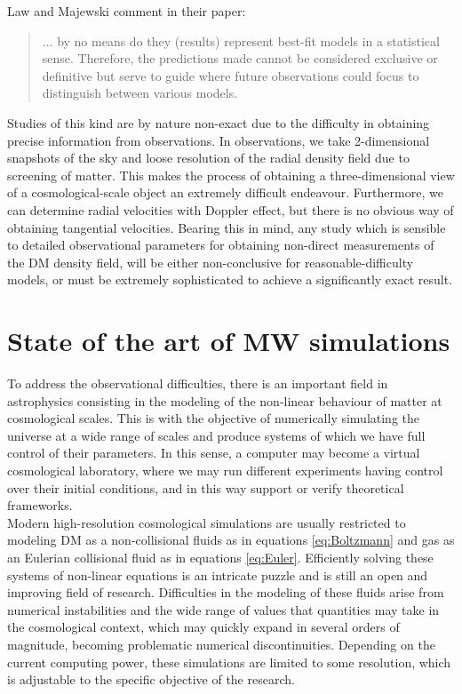 Law and Majewski comment in their paper: 

\blockquote{... by no means do they (results) represent best-fit models in a statistical sense. Therefore, the predictions made cannot be considered exclusive or definitive but serve to guide where future observations could focus to distinguish between various models.}

Studies of this kind are by nature non-exact due to the difficulty in obtaining precise information from observations.
In observations, we take 2-dimensional snapshots of the sky and loose resolution of the radial density field due to screening of matter. 
This makes the process of obtaining  a three-dimensional view of a cosmological-scale object an extremely difficult endeavour. 
Furthermore, we can determine radial velocities with Doppler effect, but there is no obvious way of obtaining tangential velocities. 
Bearing this in mind, any study which is sensible to detailed observational parameters for obtaining non-direct measurements of the DM density field, will be either non-conclusive for reasonable-difficulty models, or must be extremely sophisticated to achieve a significantly exact result.\\

\section{State of the art of MW simulations}
To address the observational difficulties, there is an important field in astrophysics consisting in the modeling of the non-linear behaviour of matter at cosmological scales. 
This is with the objective of numerically simulating the universe at a wide range of scales and produce systems of which we have full control of their parameters. 
In this sense, a computer may become a virtual cosmological laboratory, where we may run different experiments having control over their initial conditions, and in this way support or verify theoretical frameworks. \\


Modern high-resolution cosmological simulations are usually restricted to modeling DM as a non-collisional fluids as in equations \eqref{eq:Boltzmann} and gas as an Eulerian collisional fluid as in equations \eqref{eq:Euler}.  Efficiently solving these systems of non-linear equations is an intricate puzzle and is still an open and improving field of research. 
Difficulties in the modeling of these fluids arise from numerical instabilities and the wide range of values that quantities may take in the cosmological context, which may quickly expand in several orders of magnitude, becoming problematic numerical discontinuities. Depending on the current computing power, these simulations are limited to some resolution, which is adjustable to the specific objective of the research.\\



